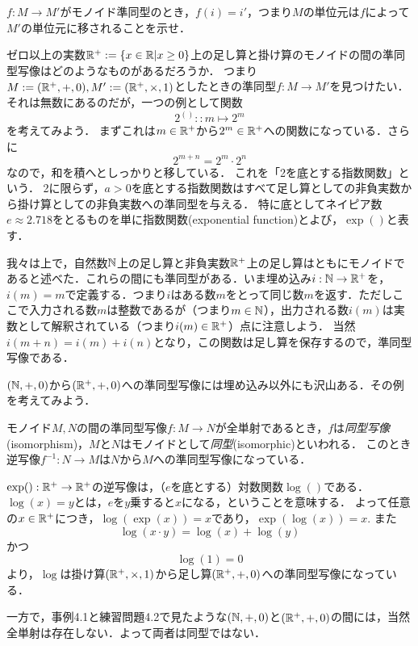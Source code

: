 \documentclass[11pt,a4paper,uplatex]{jsarticle}
\begin{document}
\begin{exercise}
    $f:M \to M'$がモノイド準同型のとき，$f(i) = i'$，つまり$M$の単位元は$f$によって$M'$の単位元に移されることを示せ．
\end{exercise}

ゼロ以上の実数$\mathbb{R}^+ := \{x \in \mathbb{R} | x \geq 0 \}$上の足し算と掛け算のモノイドの間の準同型写像はどのようなものがあるだろうか．
つまり$M := (\mathbb{R}^+, +, 0), M' := (\mathbb{R}^+, \times, 1)$としたときの準同型$f:M \to M'$を見つけたい．
それは無数にあるのだが，一つの例として関数
\[ 2^{()} :: m \mapsto 2^m \]
を考えてみよう．
まずこれは$m \in \mathbb{R}^+$から$2^m \in \mathbb{R}^+$への関数になっている．さらに
\[ 2^{m + n} = 2^m \cdot 2^n \]
なので，和を積へとしっかりと移している．
これを「2を底とする指数関数」という．
2に限らず，$a>0$を底とする指数関数はすべて足し算としての非負実数から掛け算としての非負実数への準同型を与える．
特に底としてネイピア数$e\approx 2.718$をとるものを単に指数関数(exponential function)とよび，$\exp()$と表す．

\begin{example}
    我々は上で，自然数$\mathbb{N}$上の足し算と非負実数$\mathbb{R}^+$上の足し算はともにモノイドであると述べた．これらの間にも準同型がある．いま埋め込み$i:\mathbb{N} \to \mathbb{R}^+$を，$i(m)=m$で定義する．つまり$i$はある数$m$をとって同じ数$m$を返す．ただしここで入力される数$m$は整数であるが（つまり$m \in \mathbb{N}$），出力される数$i(m)$は実数として解釈されている（つまり$i(m) \in \mathbb{R}^+$）点に注意しよう．
    当然$i(m+n) = i(m)+i(n)$となり，この関数は足し算を保存するので，準同型写像である．
\end{example} 

\begin{exercise}
    $(\mathbb{N}, +, 0)$から$(\mathbb{R}^+, +, 0)$への準同型写像には埋め込み以外にも沢山ある．その例を考えてみよう．
\end{exercise}


\begin{dfn}[同型]
    モノイド$M, N$の間の準同型写像$f:M \to N$が全単射であるとき，$f$は\emph{同型写像}(isomorphism)，$M$と$N$はモノイドとして\emph{同型}(isomorphic)といわれる．
    このとき逆写像$f^{-1}:N \to M$は$N$から$M$への準同型写像になっている．
\end{dfn}

\begin{example}
    $\exp():\mathbb{R}^+ \to \mathbb{R}^+$の逆写像は，（$e$を底とする）対数関数$\log()$である．
    $\log(x)=y$とは，$e$を$y$乗すると$x$になる，ということを意味する．
    よって任意の$x\in\mathbb{R}^+$につき，$\log(\exp(x))=x$であり，$\exp(\log(x))=x$. また
    \[ \log(x \cdot y) = \log(x) + \log(y) \]
    かつ
    \[ \log(1) = 0 \]
    より，$\log$は掛け算$(\mathbb{R}^+, \times, 1)$から足し算$(\mathbb{R}^+, +, 0)$への準同型写像になっている．

    一方で，事例4.1と練習問題4.2で見たような$(\mathbb{N}, +, 0)$と$(\mathbb{R}^+, +, 0)$の間には，当然全単射は存在しない．よって両者は同型ではない．
\end{example}
\end{document}
